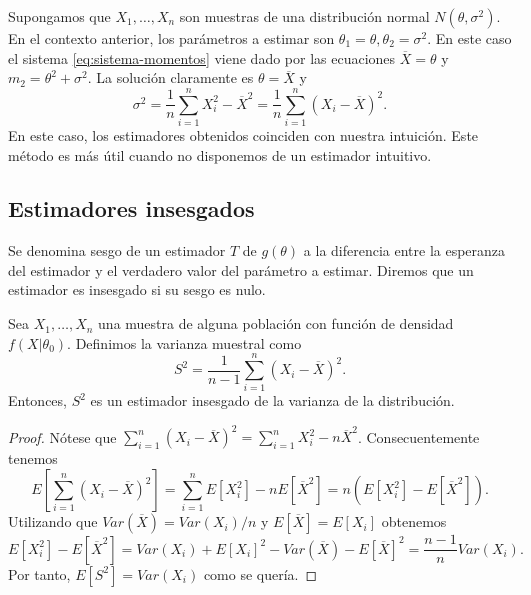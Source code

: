 \documentclass{article}
\begin{document}
\begin{example}
    Supongamos que $X_1, \ldots, X_n$ son muestras de una distribución normal $N(\theta, \sigma^2)$. En el contexto anterior, los parámetros a estimar son $\theta_1 = \theta, \theta_2 = \sigma^2$. En este caso el sistema \eqref{eq:sistema-momentos} viene dado por las ecuaciones $\overline{X} = \theta$ y $m_2 = \theta^2 + \sigma^2$. La solución claramente es $\theta = \overline{X}$ y
    \[\sigma^2 = \frac{1}{n} \sum_{i = 1}^n X_i^2 - \overline{X}^2 = \frac{1}{n} \sum_{i = 1}^n (X_i - \overline{X})^2.\]
    En este caso, los estimadores obtenidos coinciden con nuestra intuición. Este método es más útil cuando no disponemos de un estimador intuitivo.
\end{example}

\begin{example}
\end{example}

\subsection{Estimadores insesgados}

\begin{definition}
    Se denomina sesgo de un estimador $T$ de $g(\theta)$ a la diferencia entre la esperanza del estimador y el verdadero valor del parámetro a estimar. Diremos que un estimador es insesgado si su sesgo es nulo.
\end{definition}

\begin{prop}
    Sea $X_1, \ldots, X_n$ una muestra de alguna población con función de densidad $f(X | \theta_0)$. Definimos la varianza muestral como
    \[S^2 = \frac{1}{n-1}\sum_{i = 1}^n(X_i - \overline{X})^2.\]
    Entonces, $S^2$ es un estimador insesgado de la varianza de la distribución.
\end{prop}
\begin{proof}
    Nótese que $\sum_{i = 1}^n(X_i - \overline{X})^2 = \sum_{i = 1}^nX_i^2 - n\overline{X}^2$. Consecuentemente tenemos
    \[E\left[\sum_{i = 1}^n(X_i - \overline{X})^2\right] = \sum_{i = 1}^nE\left[X_i^2\right] -     nE[\overline{X}^2] = n(E\left[X_i^2\right] - E[\overline{X}^2]).\]
    Utilizando que $Var(\overline{X}) = Var(X_i) / n$ y $E[\overline{X}] = E[X_i]$ obtenemos
    \[E[X_i^2] - E[\overline{X}^2] = Var(X_i) + E[X_i]^2 - Var(\overline{X}) - E[\overline{X}]^2 = \frac{n-1}{n} Var(X_i).\]
    Por tanto, $E[S^2] = Var(X_i)$ como se quería.
\end{proof}
\end{document}

